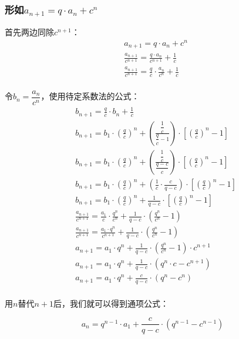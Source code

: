\documentclass[UTF8]{ctexart}
\begin{document}
\subsubsection{形如{\large$a_{n+1}=q\cdot a_n+c^n$}}
    首先两边同除$c^{n+1}$：
    \setcounter{equation}{0}
    \begin{align}
        &a_{n+1}=q\cdot a_n+c^n\\[3mm]
        &\frac{a_{n+1}}{c^{n+1}}=\frac{q\cdot a_n}{c^{n+1}}+\frac{1}{c}\\[3mm]
        &\frac{a_{n+1}}{c^{n+1}}=\frac{q}{c}\cdot \frac{a_n}{c^n}+\frac{1}{c}
    \end{align}\\
    令$b_n=\dfrac{a_n}{c^n}$，使用待定系数法的公式：
    \begin{align}
        &b_{n+1}=\frac{q}{c}\cdot b_n+\frac{1}{c}\\[3mm]
        &b_{n+1}=b_1\cdot\left(\frac{q}{c}\right)^n+\left(\frac{\dfrac{1}{c}}{\dfrac{q}{c}-1}\right)\cdot\left[\left(\frac{q}{c}\right)^n-1\right]\\[3mm]
        &b_{n+1}=b_1\cdot\left(\frac{q}{c}\right)^n+\left(\frac{\dfrac{1}{c}}{\dfrac{q-c}{c}}\right)\cdot\left[\left(\frac{q}{c}\right)^n-1\right]\\[3mm]
        &b_{n+1}=b_1\cdot\left(\frac{q}{c}\right)^n+\left(\frac{1}{c}\cdot\frac{c}{q-c}\right)\cdot\left[\left(\frac{q}{c}\right)^n-1\right]\\[3mm]
        &b_{n+1}=b_1\cdot\left(\frac{q}{c}\right)^n+\frac{1}{q-c}\cdot\left[\left(\frac{q}{c}\right)^n-1\right]\\[3mm]
        &\frac{a_{n+1}}{c^{n+1}}=\frac{a_1}{c}\cdot\frac{q^n}{c^n}+\frac{1}{q-c}\cdot\left(\frac{q^n}{c^n}-1\right)\\[3mm]
        &\frac{a_{n+1}}{c^{n+1}}=\frac{a_1\cdot q^n}{c^{n+1}}+\frac{1}{q-c}\cdot\left(\frac{q^n}{c^n}-1\right)\\[3mm]
        &a_{n+1}=a_1\cdot q^n+\frac{1}{q-c}\cdot\left(\frac{q^n}{c^n}-1\right)\cdot c^{n+1}\\[3mm]
        &a_{n+1}=a_1\cdot q^n+\frac{1}{q-c}\cdot\left(q^n\cdot c-c^{n+1}\right)\\[3mm]
        &a_{n+1}=a_1\cdot q^n+\frac{c}{q-c}\cdot\left(q^n-c^{n}\right)
    \end{align}\\
    用$n$替代$n+1$后，我们就可以得到通项公式：
    \begin{large}
    \begin{equation*}
        a_{n}=q^{n-1}\cdot a_1+\frac{c}{q-c}\cdot\left(q^{n-1}-c^{n-1}\right)
    \end{equation*}
    \end{large}
\end{document}
